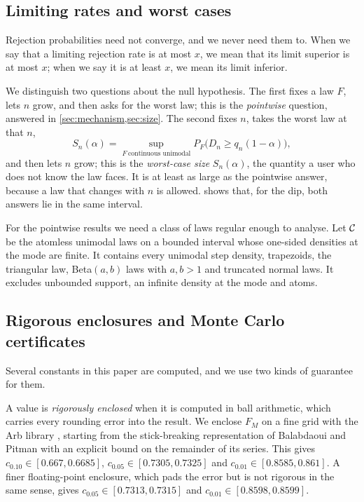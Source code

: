 \subsection{Limiting rates and worst cases}
Rejection probabilities need not converge, and we never need them to. When we say that a limiting rejection rate is at most $x$, we mean that its limit superior is at most $x$; when we say it is at least $x$, we mean its limit inferior.

We distinguish two questions about the null hypothesis. The first fixes a law $F$, lets $n$ grow, and then asks for the worst law; this is the \emph{pointwise} question, answered in \cref{sec:mechanism,sec:size}. The second fixes $n$, takes the worst law at that $n$,
\[
S_n(\alpha)=\sup_{F\ \text{continuous unimodal}}P_F\bigl(D_n\ge q_n(1-\alpha)\bigr),
\]
and then lets $n$ grow; this is the \emph{worst-case size} $S_n(\alpha)$, the quantity a user who does not know the law faces. It is at least as large as the pointwise answer, because a law that changes with $n$ is allowed.  shows that, for the dip, both answers lie in the same interval.

For the pointwise results we need a class of laws regular enough to analyse. Let $\mathcal{C}$ be the atomless unimodal laws on a bounded interval whose one-sided densities at the mode are finite. It contains every unimodal step density, trapezoids, the triangular law, Beta$(a,b)$ laws with $a,b>1$ and truncated normal laws. It excludes unbounded support, an infinite density at the mode and atoms.

\subsection{Rigorous enclosures and Monte Carlo certificates}\label{sec:numbers}
Several constants in this paper are computed, and we use two kinds of guarantee for them.

A value is \emph{rigorously enclosed} when it is computed in ball arithmetic, which carries every rounding error into the result. We enclose $F_M$ on a fine grid with the Arb library \cite{Arb}, starting from the stick-breaking representation of Balabdaoui and Pitman with an explicit bound on the remainder of its series. This gives $c_{0.10}\in[0.667,0.6685]$, $c_{0.05}\in[0.7305,0.7325]$ and $c_{0.01}\in[0.8585,0.861]$. A finer floating-point enclosure, which pads the error but is not rigorous in the same sense, gives $c_{0.05}\in[0.7313,0.7315]$ and $c_{0.01}\in[0.8598,0.8599]$.

